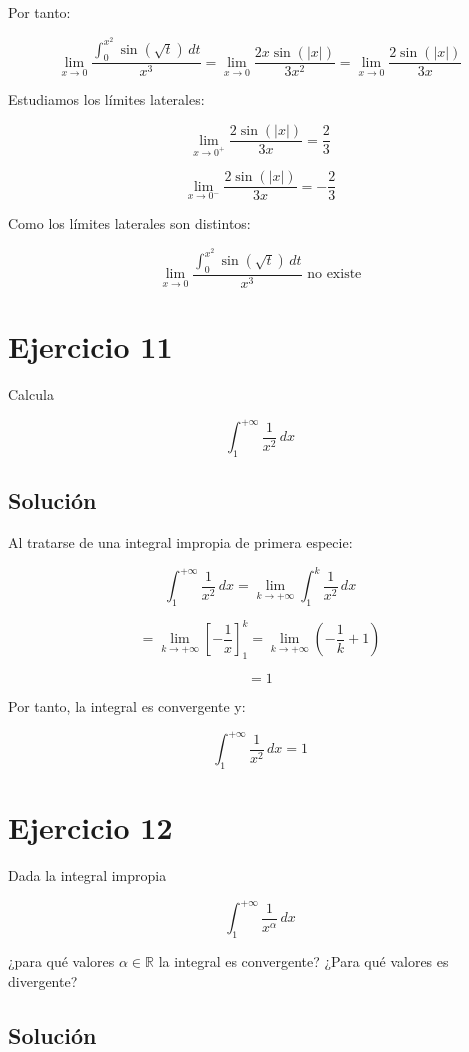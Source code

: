 \documentclass[fleqn]{article}
\begin{document}
	Por tanto:

	\[
	\lim_{x\to0}
	\frac{\displaystyle\int_0^{x^2}\sin(\sqrt{t})\,dt}{x^3}
	=
	\lim_{x\to0}
	\frac{2x\sin(|x|)}{3x^2}
	=
	\lim_{x\to0}
	\frac{2\sin(|x|)}{3x}
	\]

	Estudiamos los límites laterales:

	\[
	\lim_{x\to0^+}
	\frac{2\sin(|x|)}{3x}
	=
	\frac{2}{3}
	\]

	\[
	\lim_{x\to0^-}
	\frac{2\sin(|x|)}{3x}
	=
	-\frac{2}{3}
	\]

	Como los límites laterales son distintos:

	\[
	\boxed{
	\lim_{x\to0}
	\frac{\displaystyle\int_0^{x^2}\sin(\sqrt{t})\,dt}{x^3}
	\text{ no existe}
	}
	\]

\section{Ejercicio 11}
	Calcula

	\[
	\int_1^{+\infty}\frac{1}{x^2}\,dx
	\]

	\subsection{Solución}

	Al tratarse de una integral impropia de primera especie:

	\[
	\int_1^{+\infty}\frac{1}{x^2}\,dx
	=
	\lim_{k\to+\infty}
	\int_1^k\frac{1}{x^2}\,dx
	\]

	\[
	=
	\lim_{k\to+\infty}
	\left[
	-\frac{1}{x}
	\right]_1^k
	=
	\lim_{k\to+\infty}
	\left(
	-\frac{1}{k}+1
	\right)
	\]

	\[
	=
	1
	\]

	Por tanto, la integral es convergente y:

	\[
	\boxed{
	\int_1^{+\infty}\frac{1}{x^2}\,dx=1
	}
	\]

\section{Ejercicio 12}
	Dada la integral impropia

	\[
	\int_1^{+\infty}\frac{1}{x^\alpha}\,dx
	\]

	¿para qué valores $\alpha\in\mathbb{R}$ la integral es convergente?
	¿Para qué valores es divergente?

	\subsection{Solución}
\end{document}
